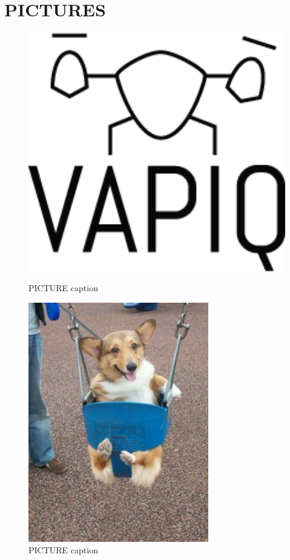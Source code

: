 \section*{PICTURES}


\begin{figure}[h]
        \centering
         \begin{minipage}[b]{0.4\textwidth}
            \includegraphics[width = 1\textwidth]{VAPIQ-PICTURES/Logo2_Tilted.png}
            \caption{PICTURE caption}
            \label{fig:testpic2}
        \end{minipage}
        \hfill
        \begin{minipage}[b]{0.4\textwidth}
            \includegraphics[width = 0.7\textwidth]{VAPIQ-PICTURES/testpic3.jpg}
            \caption{PICTURE caption}
            \label{fig:testpic3}
        \end{minipage}
\end{figure}




